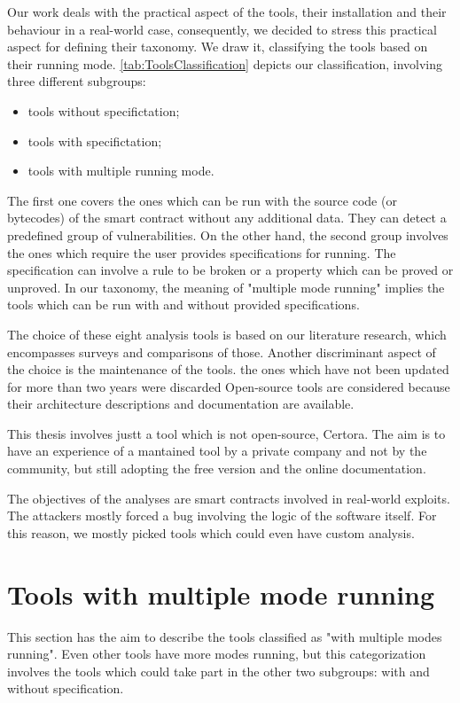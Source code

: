 Our work deals with the practical aspect of the tools, their installation and their behaviour in a real-world case, consequently, 
we decided to stress this practical aspect for defining their taxonomy.
We draw it, classifying the tools based on their running mode. \autoref{tab:ToolsClassification} depicts our classification, involving three different subgroups:
\begin{itemize}
    \item tools without specifictation;
    \item tools with specifictation;
    \item tools with multiple running mode.
\end{itemize}
The first one covers the ones which can be run with the source code (or bytecodes) of the smart contract without any additional data. 
They can detect a predefined group of vulnerabilities. 
On the other hand, the second group involves the ones which require the user provides specifications for running. The specification can involve a rule to be broken or a property which can be proved or unproved. 
In our taxonomy, the meaning of "multiple mode running" implies the tools which can be run with and without provided specifications. 

The choice of these eight analysis tools is based on our literature research, which encompasses surveys and comparisons of those. 
Another discriminant aspect of the choice is the maintenance of the tools. 
the ones which have not been updated for more than two years were discarded 
Open-source tools are considered because their architecture descriptions and documentation are available. 

This thesis involves justt a tool which is not open-source, Certora. 
The aim is to have an experience of a mantained tool by a private company and not by the community, but still adopting the free version and the online documentation.

The objectives of the analyses are smart contracts involved in real-world exploits. 
The attackers mostly forced a bug involving the logic of the software itself.
For this reason, we mostly picked tools which could even have custom analysis.

\section{Tools with multiple mode running}
This section has the aim to describe the tools classified as "with multiple modes running". 
Even other tools have more modes running, but this categorization involves the tools which could take part in the other two subgroups: 
with and without specification.

